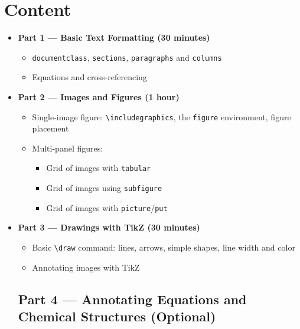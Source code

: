 \documentclass[11pt,a4paper]{article}
\begin{document}
\section*{Content}
\begin{itemize}
\item[]\textbf{Part 1 --- Basic Text Formatting (30 minutes)}
\begin{itemize}[label=$\bullet$,leftmargin=2em]
  \item \texttt{documentclass}, \texttt{sections}, \texttt{paragraphs} and \texttt{columns}
  \item Equations and cross-referencing
\end{itemize}

\item[]\textbf{Part 2 --- Images and Figures (1 hour)}
\begin{itemize}[label=$\bullet$,leftmargin=2em]
  \item Single-image figure: \verb|\includegraphics|, the \texttt{figure} environment, figure placement
  \item Multi-panel figures:
    \begin{itemize}[label=$-$,topsep=2pt]
      \item Grid of images with \texttt{tabular}
      \item Grid of images using \texttt{subfigure}
      \item Grid of images with \texttt{picture}/\texttt{put}
    \end{itemize}
\end{itemize}

\item[]\textbf{Part 3 --- Drawings with TikZ (30 minutes)}
\begin{itemize}[label=$\bullet$,leftmargin=2em]
  \item Basic \verb|\draw| command: lines, arrows, simple shapes, line
        width and color
  \item Annotating images with TikZ
\end{itemize}

\subsection*{Part 4  --- Annotating Equations and Chemical Structures (Optional)}
\end{itemize}
\end{document}
